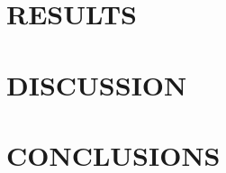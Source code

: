 \documentclass[preprint2]{aastex}              %
\begin{document}
\section{RESULTS}




\section{DISCUSSION}



\section{CONCLUSIONS}






\appendix
\twocolumn
\appendixpage

\end{document}
